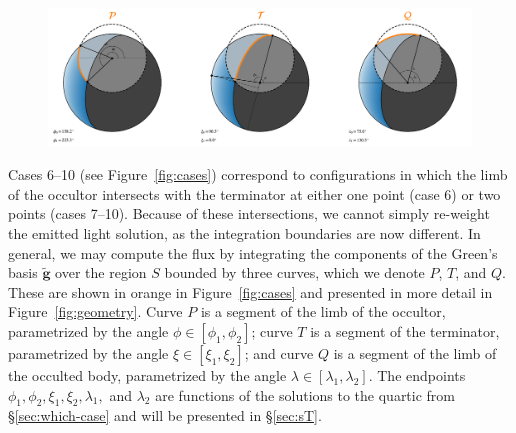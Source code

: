 \documentclass[modern]{aastex62}
\newcommand{\BF}[1]{\ensuremath{\mathbf{#1}}}
\newcommand{\bg}{\ensuremath{\tilde{\BF{g}}}}
\begin{document}
\begin{figure}[t!]
    \begin{centering}
        \includegraphics[width=\linewidth]{figures/geometry.pdf}
    \end{centering}
\end{figure}

Cases 6--10 (see Figure~\ref{fig:cases}) correspond to configurations in which
the limb of the occultor intersects with the terminator at either one point
(case 6) or two points (cases 7--10). Because of these intersections, we
cannot simply re-weight the emitted light solution, as the integration
boundaries are now different. In general, we may compute the flux by
integrating the components of the Green's basis $\bg$
over the region $S$ bounded by three curves, which we denote
$P$, $T$, and $Q$. These are shown in orange
in Figure~\ref{fig:cases} and presented in more detail in
Figure~\ref{fig:geometry}.
Curve $P$ is a segment of the limb of
the occultor, parametrized by the angle $\phi \in [\phi_1, \phi_2]$;
curve $T$ is a segment of the terminator,
parametrized by the angle $\xi \in [\xi_1, \xi_2]$;
and curve $Q$ is a segment of the limb of the occulted body,
parametrized by the angle $\lambda \in [\lambda_1, \lambda_2]$.
The endpoints $\phi_1, \phi_2, \xi_1, \xi_2, \lambda_1,$ and
$\lambda_2$ are functions of the solutions to the quartic from
\S\ref{sec:which-case} and will be presented in \S\ref{sec:sT}.
\end{document}

